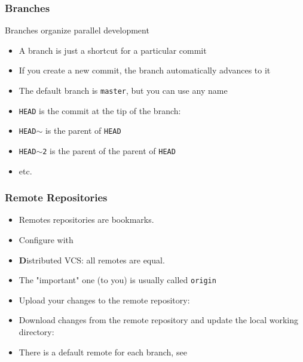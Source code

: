 \begin{frame}
  \frametitle{Branches}

  Branches organize parallel development
  \begin{itemize}
  \item<2-> A branch is just a shortcut for a particular commit
  \item<3-> If you create a new commit, the branch automatically advances
    to it
  \item<4-> The default branch is \texttt{master}, but you can use any name
  \item<5-> \texttt{HEAD} is the commit at the tip of the branch:\\
  \item<6-> \texttt{HEAD$\sim$} is the parent of \texttt{HEAD}
  \item<7-> \texttt{HEAD$\sim$2} is the parent of the parent of
    \texttt{HEAD}
  \item<7-> etc.
  \end{itemize}
\end{frame}


\begin{frame}
  \frametitle{Remote Repositories}
  
  \begin{itemize}
  \item<1-> Remotes repositories are bookmarks.
  \item<2-> Configure with 
  \item<3-> \textbf{D}istributed VCS: all remotes are equal.
  \item<4-> The "important" one (to you) is usually called \texttt{origin}
  \end{itemize}

  \begin{itemize}
  \item<5-> Upload your changes to the remote repository:\\
  \item<6-> Download changes from the remote repository and update the
    local working directory:\\
  \item<7-> There is a default remote for each branch, see\\
  \end{itemize}

\end{frame}






